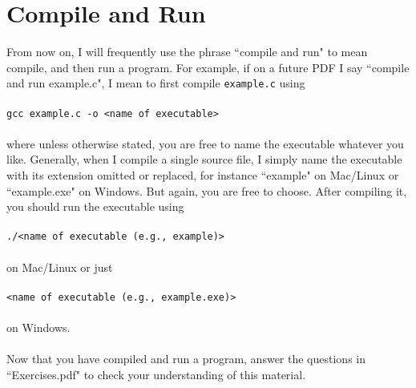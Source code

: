 \documentclass{article}
\begin{document}
\section*{Compile and Run}
From now on, I will frequently use the phrase ``compile and run" to mean compile, and then run a program. For example,
if on a future PDF I say ``compile and run example.c", I mean to first compile \verb|example.c| using \\ \\
\verb|gcc example.c -o <name of executable>| \\ \\
where unless otherwise stated, you are free to name the executable whatever you like. Generally, when I compile a 
single source file, I simply name the executable with its extension omitted or replaced, for instance ``example" on Mac/Linux or ``example.exe" on Windows.
But again, you are free to choose. After compiling it, you should run the executable using \\ \\
\verb|./<name of executable (e.g., example)>| \\ \\
on Mac/Linux or just \\ \\
\verb|<name of executable (e.g., example.exe)>| \\ \\
on Windows. \\ \\

Now that you have compiled and run a program, answer the questions in ``Exercises.pdf" to check your understanding
of this material.
\end{document}
